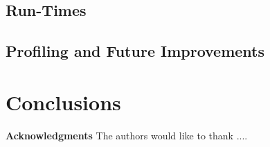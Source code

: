 \documentclass{llncs}
\begin{document}
\subsection{Run-Times}
\label{sec:run-times}

\subsection{Profiling and Future Improvements}


\section{Conclusions}
\label{sec:conclusion}


\bigskip

\noindent \textbf{Acknowledgments} The authors would like to thank ....

\vspace{-\bigskipamount}





\end{document}
